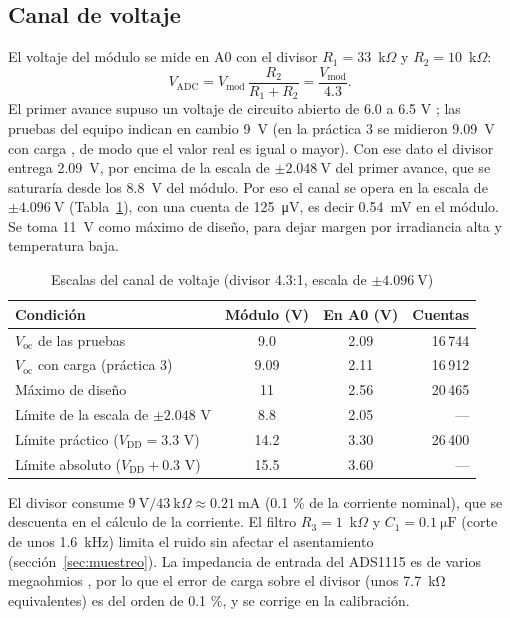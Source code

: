 \documentclass[10pt,letterpaper,twocolumn]{article}
\begin{document}
\subsection{Canal de voltaje}
El voltaje del módulo se mide en A0 con el divisor $R_1=33$~k$\Omega$ y $R_2=10$~k$\Omega$:
\begin{equation}
V_\mathrm{ADC}=V_\mathrm{mod}\,\frac{R_2}{R_1+R_2}=\frac{V_\mathrm{mod}}{4.3}.
\end{equation}
El primer avance supuso un voltaje de circuito abierto de 6.0 a 6.5 V \cite{avance1}; las pruebas del equipo indican en cambio \SI{9}{\volt} (en la práctica 3 se midieron \SI{9.09}{\volt} con carga \cite{lab3}, de modo que el valor real es igual o mayor). Con ese dato el divisor entrega \SI{2.09}{\volt}, por encima de la escala de $\pm\SI{2.048}{\volt}$ del primer avance, que se saturaría desde los \SI{8.8}{\volt} del módulo. Por eso el canal se opera en la escala de $\pm\SI{4.096}{\volt}$ (Tabla~\ref{tab:vch}), con una cuenta de \SI{125}{\micro\volt}, es decir \SI{0.54}{\milli\volt} en el módulo. Se toma \SI{11}{\volt} como máximo de diseño, para dejar margen por irradiancia alta y temperatura baja.

\begin{table}[t]
\centering
\caption{Escalas del canal de voltaje (divisor 4.3:1, escala de $\pm\SI{4.096}{\volt}$)}
\label{tab:vch}
\footnotesize
\begin{tabular}{@{}lccr@{}}
\toprule
Condición & Módulo (V) & En A0 (V) & Cuentas\\
\midrule
$V_\mathrm{oc}$ de las pruebas & 9.0 & 2.09 & 16\,744\\
$V_\mathrm{oc}$ con carga (práctica 3) & 9.09 & 2.11 & 16\,912\\
Máximo de diseño & 11 & 2.56 & 20\,465\\
Límite de la escala de $\pm 2.048$ V & 8.8 & 2.05 & ---\\
Límite práctico ($V_\mathrm{DD}=3.3$ V) & 14.2 & 3.30 & 26\,400\\
Límite absoluto ($V_\mathrm{DD}+0.3$ V) & 15.5 & 3.60 & ---\\
\bottomrule
\end{tabular}
\end{table}

El divisor consume $9\ \mathrm{V}/43\ \mathrm{k}\Omega\approx\SI{0.21}{\milli\ampere}$ (0.1 \% de la corriente nominal), que se descuenta en el cálculo de la corriente. El filtro $R_3=1$~k$\Omega$ y $C_1=\SI{0.1}{\micro\farad}$ (corte de unos \SI{1.6}{\kilo\hertz}) limita el ruido sin afectar el asentamiento (sección~\ref{sec:muestreo}). La impedancia de entrada del ADS1115 es de varios megaohmios \cite{ads1115}, por lo que el error de carga sobre el divisor (unos \SI{7.7}{\kilo\ohm} equivalentes) es del orden de 0.1 \%, y se corrige en la calibración.
\end{document}
